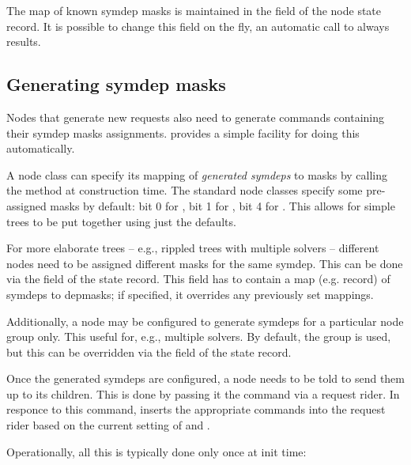 \documentclass[10pt,twoside]{book}
\begin{document}
  The map of known symdep masks is maintained in the  field of
  the node state record. It is possible to change this field on the fly, an
  automatic call to  always results.

\subsection{Generating symdep masks}

  Nodes that generate new requests also need to generate 
  commands containing their symdep masks assignments.  provides a
  simple facility for doing this automatically.
  
  A node class can specify its mapping of {\em generated symdeps} to masks
  by calling the  method at construction time. The standard
  node classes specify some pre-assigned masks by default: bit 0 for
  , bit 1 for , bit 4 for . This
  allows for simple trees to be put together using just the defaults.
  
  For more elaborate trees -- e.g., rippled trees with multiple solvers --
  different  nodes need to be assigned different masks for the same
  symdep. This can be done via the  field of the state record.
  This field has to contain a map (e.g. record) of symdeps to depmasks; if
  specified, it overrides any previously set mappings. 
  
  Additionally, a node may be configured to generate symdeps for a particular
  node group only. This useful for, e.g., multiple solvers. By default, the
   group is used, but this can be overridden via the
   field of the state record.

  Once the generated symdeps are configured, a node needs to be told to send
  them up to its children. This is done by passing it the 
  command via a request rider. In responce to this command,
   inserts the appropriate  commands
  into the request rider based on the current setting of  and
  .
  
  Operationally, all this is typically done only once at init time:
  
\end{document}
